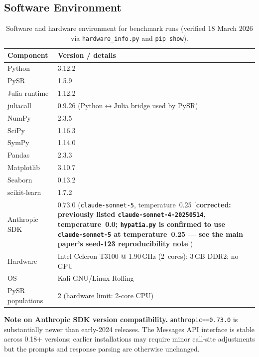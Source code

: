 \documentclass[twoside,11pt]{article}
\begin{document}
\subsection*{Software Environment}

\begin{table}[H]
\centering
\caption{Software and hardware environment for benchmark runs
         (verified 18 March 2026 via \texttt{hardware\_info.py} and
         \texttt{pip show}).}
\label{tab:software_env}
\small
\begin{tabular}{ll}
\toprule
\textbf{Component} & \textbf{Version / details} \\
\midrule
Python           & 3.12.2 \\
PySR             & 1.5.9 \\
Julia runtime    & 1.12.2 \\
juliacall        & 0.9.26 (Python$\leftrightarrow$Julia bridge used by PySR) \\
NumPy            & 2.3.5 \\
SciPy            & 1.16.3 \\
SymPy            & 1.14.0 \\
Pandas           & 2.3.3 \\
Matplotlib       & 3.10.7 \\
Seaborn          & 0.13.2 \\
scikit-learn     & 1.7.2 \\
Anthropic SDK    & 0.73.0 (\texttt{claude-sonnet-5},
                   temperature~0.25 \textbf{[corrected: previously listed
                   \texttt{claude-sonnet-4-20250514}, temperature~0.0;
                   \texttt{hypatia.py} is confirmed to use
                   \texttt{claude-sonnet-5} at temperature~0.25 --- see
                   the main paper's seed-123 reproducibility note]}) \\
\midrule
Hardware         & Intel Celeron T3100 @ 1.90\,GHz (2~cores);
                   3\,GB DDR2; no GPU \\
OS               & Kali GNU/Linux Rolling \\
PySR populations & 2 (hardware limit: 2-core CPU) \\
\bottomrule
\end{tabular}
\end{table}

\noindent\textbf{Note on Anthropic SDK version compatibility.}
\texttt{anthropic==0.73.0} is substantially newer than early-2024 releases.
The Messages API interface is stable across 0.18$+$ versions; earlier
installations may require minor call-site adjustments but the prompts and
response parsing are otherwise unchanged.
\end{document}
